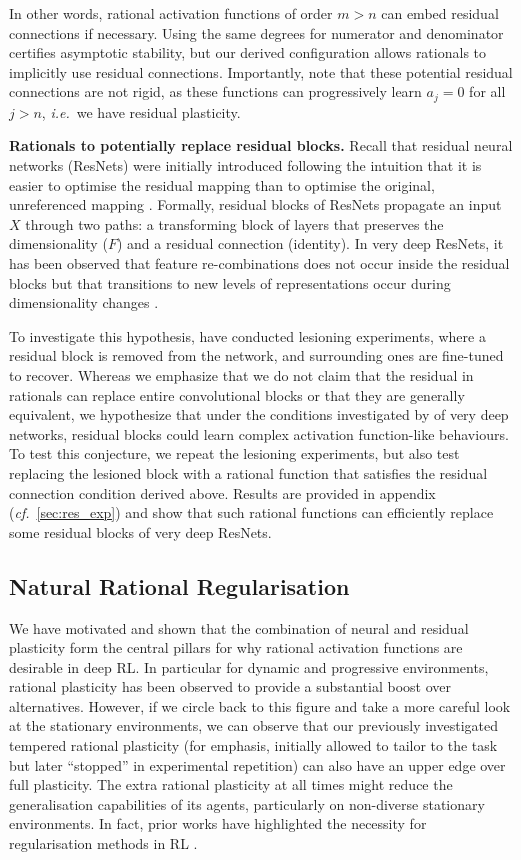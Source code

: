 \documentclass[accepted]{article}
\theoremstyle{plain}
\theoremstyle{definition}
\theoremstyle{remark}
\newcommand{\ie}{\emph{i.e.}~}
\newcommand{\cf}{\emph{cf.}~}
\begin{document}
In other words, rational activation functions of order $m > n$ can embed residual connections if necessary. Using the same degrees for numerator and denominator certifies asymptotic stability, but our derived configuration allows rationals to implicitly use residual connections.
Importantly, note that these potential residual connections are not rigid, as these functions can progressively learn $a_j\! =\! 0$ for all $j\!  >\!  n$, \ie we have residual plasticity.

\textbf{Rationals to potentially replace residual blocks.} 
Recall that residual neural networks (ResNets) were initially introduced following the intuition that it is easier to optimise the residual mapping than to optimise the original, unreferenced mapping \citep{HeZRS16}. 
Formally, residual blocks of ResNets propagate an input $X$ through two paths: a transforming block of layers that preserves the dimensionality ($F$) and a residual connection (identity). 
In very deep ResNets, it has been observed that feature re-combinations does not occur inside the residual blocks but that transitions to new levels of representations occur during dimensionality changes \cite{VeitWB16, greff2016highway}. 

To investigate this hypothesis, \citeauthor{VeitWB16} have conducted lesioning experiments, where a residual block is removed from the network, and surrounding ones are fine-tuned to recover. Whereas we emphasize that we do not claim that the residual in rationals can replace entire convolutional blocks or that they are generally equivalent, we hypothesize that under the conditions investigated by \citeauthor{VeitWB16} of very deep networks, residual blocks could learn complex activation function-like behaviours. To test this conjecture, we repeat the lesioning experiments, but also test replacing the lesioned block with a rational function that satisfies the residual connection condition derived above. Results are provided in appendix (\cf \ref{sec:res_exp}) and show that such rational functions can efficiently replace some residual blocks of very deep ResNets. 

\subsection{Natural Rational Regularisation} 
We have motivated and shown that the combination of neural and residual plasticity form the central pillars for why rational activation functions are desirable in deep RL. In particular for dynamic and progressive environments, rational plasticity has been observed to provide a substantial boost over alternatives. However, if we circle back to this figure and take a more careful look at the stationary environments, we can observe that our previously investigated tempered rational plasticity (for emphasis, initially allowed to tailor to the task but later ``stopped'' in experimental repetition) can also have an upper edge over full plasticity. The extra rational plasticity at all times might reduce the generalisation capabilities of its agents, particularly on non-diverse stationary environments. In fact, prior works have highlighted the necessity for regularisation methods in RL \citep{farebrother2018regdqn, RoyBHNP20regul, YaratsKF21Image}. 
\end{document}

